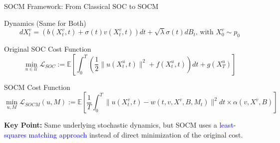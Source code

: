 \documentclass[aspectratio=169,xcolor=dvipsnames]{beamer}
\begin{document}
\begin{frame}{SOCM Framework: From Classical SOC to SOCM}
    \small
    \begin{block}{Dynamics (Same for Both)}
        \begin{equation}
        dX^v_t = (b(X^v_t, t) + \sigma(t)v(X^v_t, t)) dt + \sqrt{\lambda}\sigma(t) dB_t \text{, with } X^v_0 \sim p_0
        \end{equation}
    \end{block}

    \begin{block}{Original SOC Cost Function}
        \begin{equation}
        \min_{u \in \mathcal{U}} \mathcal{L}_{SOC} := \mathbb{E}\left[\int_0^T \left(\frac{1}{2}\|u(X_t^u, t)\|^2 + f(X_t^u, t)\right) dt + g(X_T^u)\right]
        \end{equation}
    \end{block}

    \begin{alertblock}{SOCM Cost Function}
        \begin{equation}
        \min_{u, M} \mathcal{L}_{SOCM}(u, M) := \mathbb{E}\left[\frac{1}{T}\int_0^T \|u(X^v_t, t) - w(t, v, X^v, B, M_t)\|^2 dt \times \alpha(v, X^v, B)\right]
        \end{equation}
    \end{alertblock}

    \vspace{0.2cm}
    \small
    \textbf{Key Point:} Same underlying stochastic dynamics, but SOCM uses a \textcolor{blue}{least-squares matching approach} instead of direct minimization of the original cost.
\end{frame}
\end{document}
